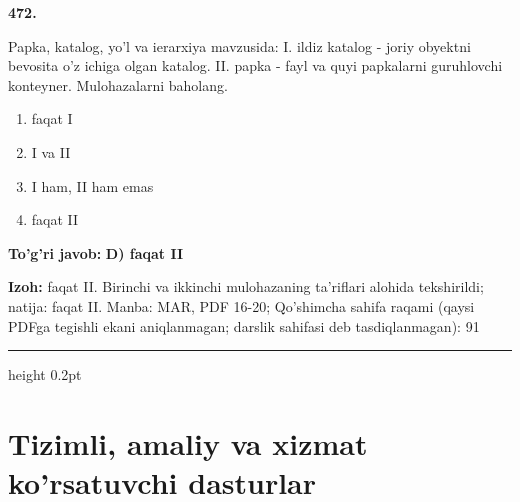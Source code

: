 \documentclass[10pt,a4paper]{article}
\begin{document}
{\bfseries\sffamily\color{ink} 472.}
\par
Papka, katalog, yo'l va ierarxiya mavzusida: I. ildiz katalog - joriy obyektni bevosita o'z ichiga olgan katalog. II. papka - fayl va quyi papkalarni guruhlovchi konteyner. Mulohazalarni baholang.
\begin{enumerate}[label=\Alph*),leftmargin=9mm]
\item faqat I
\item I va II
\item I ham, II ham emas
\item faqat II
\end{enumerate}
\begin{tcolorbox}[enhanced,breakable,colback=teal!4,colframe=teal!60!black,boxrule=0.45pt,arc=1.2mm,left=2.7mm,right=2.7mm,top=1.8mm,bottom=1.8mm,before skip=2mm,after skip=2mm]
{\bfseries\sffamily\color{teal}To'g'ri javob:} \textbf{D) faqat II}
\par\smallskip
{\bfseries Izoh:} faqat II. Birinchi va ikkinchi mulohazaning ta'riflari alohida tekshirildi; natija: faqat II. Manba: MAR, PDF 16-20; Qo'shimcha sahifa raqami (qaysi PDFga tegishli ekani aniqlanmagan; darslik sahifasi deb tasdiqlanmagan): 91
\end{tcolorbox}
\vspace{2mm}\hrule height 0.2pt\vspace{3mm}
\clearpage
\section{Tizimli, amaliy va xizmat ko'rsatuvchi dasturlar}
\end{document}
